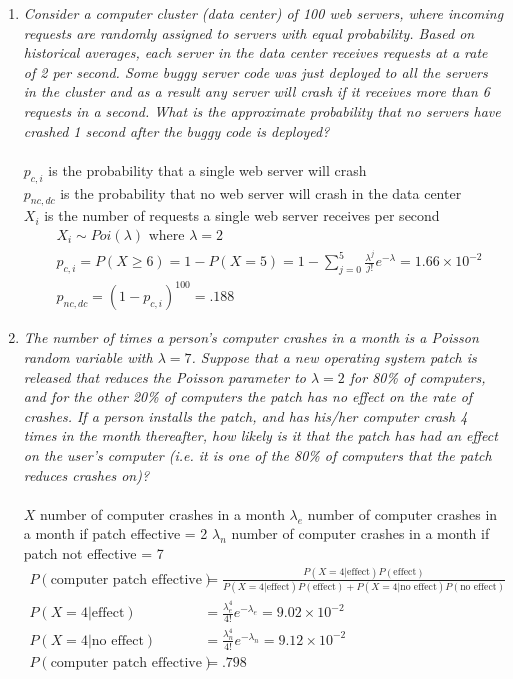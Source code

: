 \documentclass{article} %
\begin{document}
\begin{enumerate}
\begin{enumerate}
	\end{enumerate}
	
	\item \textit{Consider a computer cluster (data center) of 100 web servers, where incoming requests are randomly assigned to servers with equal probability. Based on historical averages, each server in the data center receives requests at a rate of 2 per second. Some buggy server code was just deployed to all the servers in the cluster and as a result any server will crash if it receives more than 6 requests in a second. What is the approximate probability that no servers have crashed 1 second after the buggy code is deployed?}\\
	\\
	$p_{c,i}$ is the probability that a single web server will crash\\
	$p_{nc,dc}$ is the probability that no web server will crash in the data center\\
	$X_i$ is the number of requests a single web server receives per second
	\begin{align*}
	&X_i \sim Poi(\lambda) \text{ where } \lambda = 2\\
	&p_{c,i} = P(X \geq 6) = 1 - P(X = 5) = 1 - \sum_{j=0}^{5} \frac{\lambda^j}{j!}e^{-\lambda} = 1.66 \times 10^{-2}\\
	&p_{nc,dc} = (1 - p_{c,i})^{100} = .188
	\end{align*}
	
	\item \textit{The number of times a person's computer crashes in a month is a Poisson random variable with $\lambda = 7$. Suppose that a new operating system patch is released that reduces the Poisson parameter to $\lambda = 2$ for 80\% of computers, and for the other 20\% of computers the patch has no effect on the rate of crashes. If a person installs the patch, and has his/her computer crash 4 times in the month thereafter, how likely is it that the patch has had an effect on the user's computer (i.e. it is one of the 80\% of computers that the patch reduces crashes on)?}\\
	\\
	$X$ number of computer crashes in a month
	$\lambda_e$ number of computer crashes in a month if patch effective = 2
	$\lambda_n$ number of computer crashes in a month if patch not effective = 7
	\begin{align*}
	P(\text{computer patch effective}) &= \frac{P(X = 4 | \text{effect})P(\text{effect})}{P(X = 4 | \text{effect})P(\text{effect}) + P(X = 4 | \text{no effect})P(\text{no effect})}\\
	P(X = 4 | \text{effect}) &= \frac{\lambda_e^4}{4!}e^{-\lambda_e} = 9.02 \times 10^{-2}\\
	P(X = 4 | \text{no effect}) &= \frac{\lambda_n^4}{4!}e^{-\lambda_n} = 9.12 \times 10^{-2}\\
	P(\text{computer patch effective}) &= .798
	\end{align*}
	

\end{enumerate}
\end{document}
